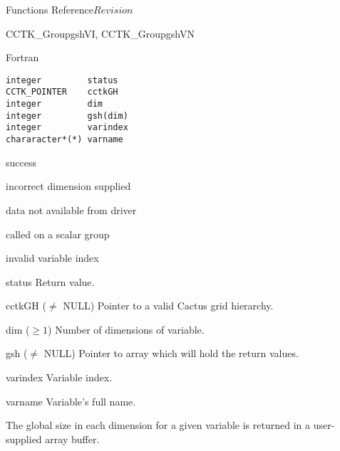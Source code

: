 \begin{cactuspart}{ Functions Reference}{}{$Revision$}
\begin{FunctionDescription}{CCTK\_GroupgshVI, CCTK\_GroupgshVN}
\begin{SynopsisSection}
\begin{Synopsis}{Fortran}
\begin{verbatim}
integer         status
CCTK_POINTER    cctkGH
integer         dim
integer         gsh(dim)
integer         varindex
chararacter*(*) varname
\end{verbatim}
\end{Synopsis}
\end{SynopsisSection}

\begin{ResultSection}
\begin{Result}{0} success \end{Result}
\begin{Result}{-1} incorrect dimension supplied \end{Result}
\begin{Result}{-2} data not available from driver \end{Result}
\begin{Result}{-3} called on a scalar group \end{Result}
\begin{Result}{-4} invalid variable index \end{Result}
\end{ResultSection}

\begin{ParameterSection}
\begin{Parameter}{status} Return value. \end{Parameter}
\begin{Parameter}{cctkGH ($\ne$ NULL)} Pointer to a valid Cactus grid hierarchy. \end{Parameter}
\begin{Parameter}{dim ($\ge 1$)} Number of dimensions of variable. \end{Parameter}
\begin{Parameter}{gsh ($\ne$ NULL)} Pointer to array which will hold the return values. \end{Parameter}
\begin{Parameter}{varindex} Variable index. \end{Parameter}
\begin{Parameter}{varname} Variable's full name. \end{Parameter}
\end{ParameterSection}

\begin{Discussion}
The global size in each dimension for a given variable is returned in a user-supplied array buffer.
\end{Discussion}


\end{FunctionDescription}
\end{cactuspart}
